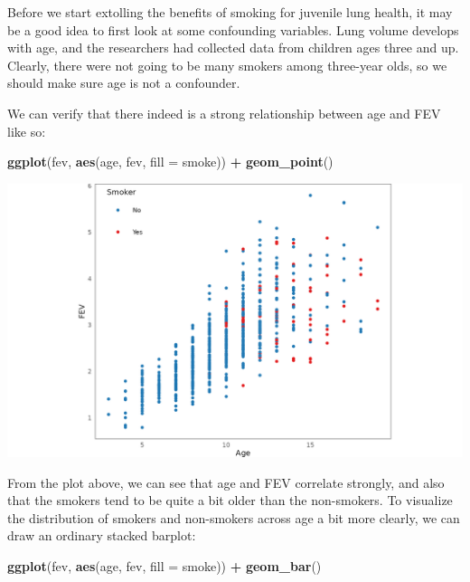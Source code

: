 \documentclass[
]{book}
\newenvironment{Shaded}{\begin{snugshade}}{\end{snugshade}}
\newcommand{\AttributeTok}[1]{\textcolor[rgb]{0.13,0.29,0.53}{#1}}
\newcommand{\FunctionTok}[1]{\textcolor[rgb]{0.13,0.29,0.53}{\textbf{#1}}}
\newcommand{\NormalTok}[1]{#1}
\newcommand{\SpecialCharTok}[1]{\textcolor[rgb]{0.81,0.36,0.00}{\textbf{#1}}}
\theoremstyle{definition}
\theoremstyle{definition}
\theoremstyle{definition}
\theoremstyle{definition}
\theoremstyle{remark}
\begin{document}
Before we start extolling the benefits of smoking for juvenile lung health, it may be a good idea to first look at some confounding variables. Lung volume develops with age, and the researchers had collected data from children ages three and up. Clearly, there were not going to be many smokers among three-year olds, so we should make sure age is not a confounder.

We can verify that there indeed is a strong relationship between age and FEV like so:

\begin{Shaded}
\begin{Highlighting}[]
\FunctionTok{ggplot}\NormalTok{(fev, }\FunctionTok{aes}\NormalTok{(age, fev, }\AttributeTok{fill =}\NormalTok{ smoke)) }\SpecialCharTok{+}
  \FunctionTok{geom\_point}\NormalTok{()}
\end{Highlighting}
\end{Shaded}

\begin{center}\includegraphics[width=1\linewidth,height=1\textheight]{./figures/grammar-scatterplot} \end{center}

From the plot above, we can see that age and FEV correlate strongly, and also that the smokers tend to be quite a bit older than the non-smokers. To visualize the distribution of smokers and non-smokers across age a bit more clearly, we can draw an ordinary stacked barplot:

\begin{Shaded}
\begin{Highlighting}[]
\FunctionTok{ggplot}\NormalTok{(fev, }\FunctionTok{aes}\NormalTok{(age, fev, }\AttributeTok{fill =}\NormalTok{ smoke)) }\SpecialCharTok{+}
  \FunctionTok{geom\_bar}\NormalTok{()}
\end{Highlighting}
\end{Shaded}
\end{document}

